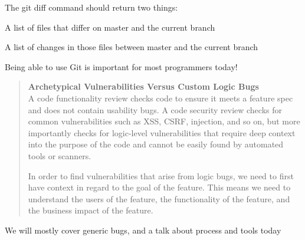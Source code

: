 \documentclass[Screen16to9,17pt]{foils}
\begin{document}
The git diff command should return two things:
\begin{list2}
\item A list of files that differ on master and the current branch
\item A list of changes in those files between master and the current branch
\end{list2}

Being able to use Git is important for most programmers today!




\begin{quote}{\bf
Archetypical Vulnerabilities Versus Custom Logic Bugs}\\
A code functionality review checks code to ensure it meets a feature spec and does not contain usability bugs. A code security review checks for common vulnerabilities such as XSS, CSRF, injection, and so on, but more importantly checks for logic-level vulnerabilities that require deep context into the purpose of the code and cannot be easily found by automated tools or scanners.

In order to find vulnerabilities that arise from logic bugs, we need to first have context in regard to the goal of the feature. This means we need to understand the users of the feature, the functionality of the feature, and the business impact of the feature.
\end{quote}

\begin{list2}
\item We will mostly cover generic bugs, and a talk about process and tools today
\end{list2}

\end{document}

